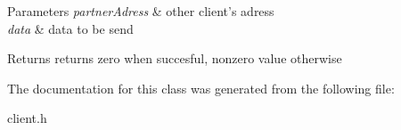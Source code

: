 \begin{DoxyParams}{Parameters}
{\em partner\-Adress} & other client's adress \\
\hline
{\em data} & data to be send\\
\hline
\end{DoxyParams}
\begin{DoxyReturn}{Returns}
returns zero when succesful, nonzero value otherwise 
\end{DoxyReturn}


The documentation for this class was generated from the following file\-:\begin{DoxyCompactItemize}
\item 
client.\-h\end{DoxyCompactItemize}
